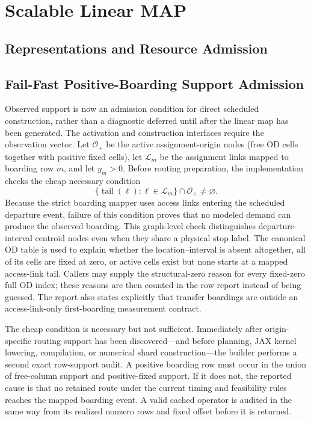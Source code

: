 
\section{Scalable Linear MAP}
\subsection{Representations and Resource Admission}




\subsection{Fail-Fast Positive-Boarding Support Admission}

Observed support is now an admission condition for direct scheduled
construction, rather than a diagnostic deferred until after the linear map
has been generated.  The activation and construction interfaces require the
observation vector.  Let $\mathcal O_{+}$ be the active assignment-origin
nodes (free OD cells together with positive fixed cells), let
$\mathcal L_m$ be the assignment links mapped to boarding row $m$, and let
$y_m>0$.  Before routing preparation, the implementation checks the cheap
necessary condition
\[
  \{\operatorname{tail}(\ell):\ell\in\mathcal L_m\}
  \cap \mathcal O_{+}\ne\varnothing.
\]
Because the strict boarding mapper uses access links entering the scheduled
departure event, failure of this condition proves that no modeled demand can
produce the observed boarding.  This graph-level check distinguishes
departure-interval centroid nodes even when they share a physical stop label.
The canonical OD table is used to explain whether the location--interval is
absent altogether, all of its cells are fixed at zero, or active cells exist
but none starts at a mapped access-link tail.  Callers may supply the
structural-zero reason for every fixed-zero full OD index; these reasons are
then counted in the row report instead of being guessed.  The report also
states explicitly that transfer boardings are outside an access-link-only
first-boarding measurement contract.

The cheap condition is necessary but not sufficient.  Immediately after
origin-specific routing support has been discovered---and before planning,
JAX kernel lowering, compilation, or numerical shard construction---the
builder performs a second exact row-support audit.  A positive boarding row
must occur in the union of free-column support and positive-fixed support.  If
it does not, the reported cause is that no retained route under the current
timing and feasibility rules reaches the mapped boarding event.  A valid
cached operator is audited in the same way from its realized nonzero rows and
fixed offset before it is returned.

